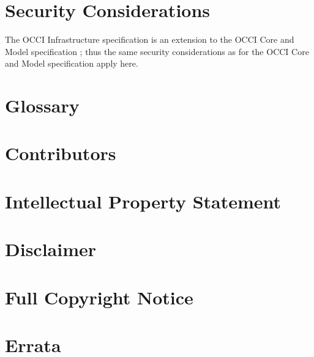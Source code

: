 \documentclass[10pt,a4paper]{article}
\begin{document}

\section{Security Considerations}
The OCCI Infrastructure specification is an extension to the OCCI Core
and Model specification \cite{occi:core}; thus the same security
considerations as for the OCCI Core and Model specification apply
here.

\section{Glossary}
\label{sec:glossary}


\section{Contributors}


\section{Intellectual Property Statement}


\section{Disclaimer}


\section{Full Copyright Notice}





\appendix

\newpage
\section{Errata}
\label{sec:errata}
\end{document}
